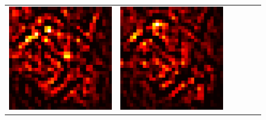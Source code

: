 \documentclass[preprint,12pt]{elsarticle}
\begin{document}
\begin{figure}[p]
\begin{tabular}{cccccc}
  \includegraphics[scale=\scale]{../visualizations/examples/cifar10/resnet18/positive_saliency_map/6.png} & 
  \includegraphics[scale=\scale]{../visualizations/examples/cifar10/resnet18/negative_saliency_map/6.png} & 

\end{tabular}
\end{figure}
\end{document}
